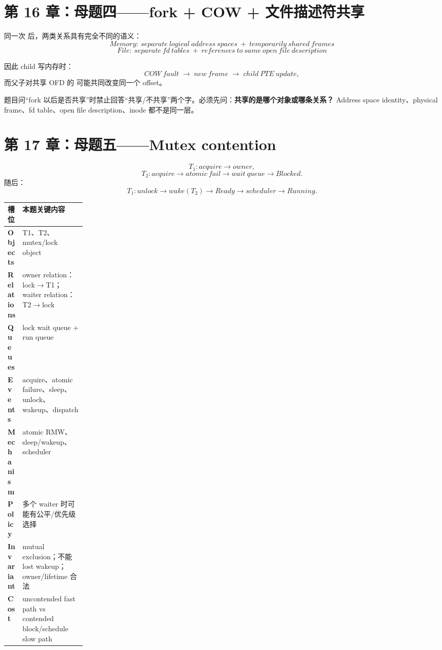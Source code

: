 \documentclass[11pt,a4paper]{ctexart}
\newcommand{\kw}[1]{\textbf{#1}}
\newcommand{\code}[1]{\texttt{\detokenize{#1}}}
\newcommand{\arr}{\;\longrightarrow\;}
\begin{document}
\section{第 16 章：母题四——fork + COW + 文件描述符共享}

同一次 \code{fork()} 后，两类关系具有完全不同的语义：
\[
\boxed{Memory:\ separate\ logical\ address\ spaces\ +\ temporarily\ shared\ frames}
\]
\[
\boxed{File:\ separate\ fd\ tables\ +\ references\ to\ same\ open\ file\ description}
\]

因此 child 写内存时：
\[
COW\ fault\arr new\ frame\arr child\ PTE\ update,
\]
而父子对共享 OFD 的 \code{read/lseek} 可能共同改变同一个 offset。

\begin{exam}[跨专题识别点]
题目问“fork 以后是否共享”时禁止回答“共享/不共享”两个字。必须先问：\kw{共享的是哪个对象或哪条关系？} Address space identity、physical frame、fd table、open file description、inode 都不是同一层。
\end{exam}

\section{第 17 章：母题五——Mutex contention}

\[
T_1:acquire\rightarrow owner,
\]
\[
T_2:acquire\rightarrow atomic\ fail\rightarrow wait\ queue\rightarrow Blocked.
\]
随后：
\[
T_1:unlock\rightarrow wake(T_2)\rightarrow Ready\rightarrow scheduler\rightarrow Running.
\]

\begin{center}
\small
\begin{tabularx}{\linewidth}{>{\bfseries}p{0.18\linewidth} X}
\toprule
槽位 & 本题关键内容 \\
\midrule
Objects & T1、T2、mutex/lock object \\
Relations & owner relation：lock$\to$T1；waiter relation：T2$\to$lock \\
Queues & lock wait queue + run queue \\
Events & acquire、atomic failure、sleep、unlock、wakeup、dispatch \\
Mechanism & atomic RMW、sleep/wakeup、scheduler \\
Policy & 多个 waiter 时可能有公平/优先级选择 \\
Invariant & mutual exclusion；不能 lost wakeup；owner/lifetime 合法 \\
Cost & uncontended fast path vs contended block/schedule slow path \\
\bottomrule
\end{tabularx}
\end{center}
\end{document}
